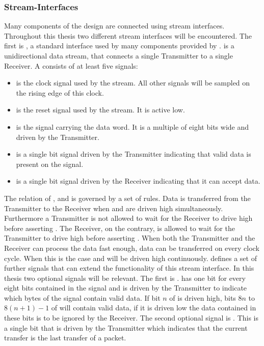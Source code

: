 \subsubsection{Stream-Interfaces}
Many components of the \FPGA{} design are connected using stream interfaces. Throughout this thesis two different stream interfaces will be encountered. The first is \AXIStream{}\autocite{ref:axi_stream}, a standard interface used by many components provided by \Xilinx{}.
\AXIStream{} is a unidirectional data stream, that connects a single Transmitter to a single Receiver. A \AXIStream{} consists of at least five signals:
\begin{itemize}
    \item \ACLK{} is the clock signal used by the stream. All other signals will be sampled on the rising edge of this clock.
    \item \ARESETn{} is the reset signal used by the stream. It is active low.
    \item \TDATA{} is the signal carrying the data word. It is a multiple of eight bits wide and driven by the Transmitter.
    \item \TVALID{} is a single bit signal driven by the Transmitter indicating that valid data is present on the \TDATA{} signal.
    \item \TREADY{} is a single bit signal driven by the Receiver indicating that it can accept data.
\end{itemize}
The relation of \TDATA{}, \TVALID{} and \TREADY{} is governed by a set of rules.
Data is transferred from the Transmitter to the Receiver when \TREADY{} and \TVALID{} are driven high simultaneously.
Furthermore a Transmitter is not allowed to wait for the Receiver to drive \TREADY{} high before asserting \TVALID{}. The Receiver, on the contrary, is allowed to wait for the Transmitter to drive \TVALID{} high before asserting \TREADY{}.
When both the Transmitter and the Receiver can process the data fast enough, data can be transferred on every clock cycle. When this is the case \TREADY{} and \TVALID{} will be driven high continuously.
\AXIStream{} defines a set of further signals that can extend the functionality of this stream interface. In this thesis two optional signals will be relevant.
The first is \TKEEP{}. \TKEEP{} has one bit for every eight bits contained in the \TDATA{} signal and is driven by the Transmitter to indicate which bytes of the \TDATA{} signal contain valid data.
If bit $n$ of \TKEEP{} is driven high, bits $8n$ to $8(n + 1) - 1$ of \TDATA{} will contain valid data, if it is driven low the data contained in these bits is to be ignored by the Receiver.
The second optional signal is \TLAST{}. This is a single bit that is driven by the Transmitter which indicates that the current transfer is the last transfer of a packet.

